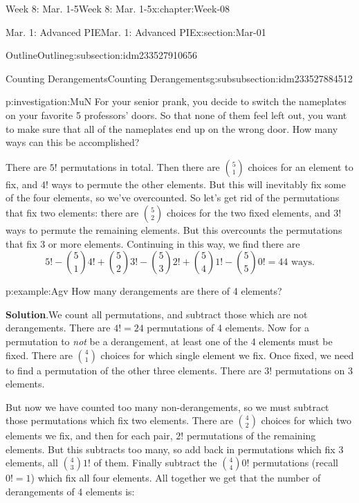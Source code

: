 \documentclass[oneside,10pt,]{book}
\newcommand{\blocktitlefont}{\relax}
\numberwithin{equation}{section}
\begin{document}
\begin{chapterptx}{Week 8: Mar. 1-5}{}{Week 8: Mar. 1-5}{}{}{x:chapter:Week-08}
\begin{sectionptx}{Mar. 1: Advanced PIE}{}{Mar. 1: Advanced PIE}{}{}{x:section:Mar-01}
\begin{subsectionptx}{Outline}{}{Outline}{}{}{g:subsection:idm233527910656}
\typeout{************************************************}
%
\begin{subsubsectionptx}{Counting Derangements}{}{Counting Derangements}{}{}{g:subsubsection:idm233527884512}
\begin{investigation}{}{p:investigation:MuN}%
For your senior prank, you decide to switch the nameplates on your favorite 5 professors' doors. So that none of them feel left out, you want to make sure that all of the nameplates end up on the wrong door. How many ways can this be accomplished?%
\par\smallskip%
\noindent\hypertarget{g:solution:idm233527883088}{}There are \(5!\) permutations in total. Then there are \(\binom{5}{1}\) choices for an element to fix, and \(4!\) ways to permute the other elements. But this will inevitably fix some of the four elements, so we've overcounted. So let's get rid of the permutations that fix two elements: there are \(\binom{5}{2}\) choices for the two fixed elements, and 3! ways to permute the remaining elements. But this overcounts the permutations that fix 3 or more elements. Continuing in this way, we find there are%
%
\begin{equation*}
5! - \binom{5}{1}4! + \binom{5}{2}3! - \binom{5}{3} 2! + \binom{5}{4} 1! - \binom{5}{5}0! = 44 \text{ ways}.
\end{equation*}
\end{investigation}%
\begin{example}{}{p:example:Agv}%
How many derangements are there of 4 elements?%
\par\smallskip%
\noindent\textbf{\blocktitlefont Solution}.\hypertarget{p:solution:GFB}{}\quad{}We count all permutations, and subtract those which are not derangements. There are \(4! = 24\) permutations of 4 elements. Now for a permutation to \emph{not} be a derangement, at least one of the 4 elements must be fixed. There are \({4 \choose 1}\) choices for which single element we fix. Once fixed, we need to find a permutation of the other three elements. There are \(3!\) permutations on 3 elements.%
\par
But now we have counted too many non-derangements, so we must subtract those permutations which fix two elements. There are \({4 \choose 2}\) choices for which two elements we fix, and then for each pair, \(2!\) permutations of the remaining elements. But this subtracts too many, so add back in permutations which fix 3 elements, all \({4 \choose 3}1!\) of them. Finally subtract the \({4 \choose 4}0!\) permutations (recall \(0! = 1\)) which fix all four elements. All together we get that the number of derangements of 4 elements is:%

\end{example}
\end{subsubsectionptx}
\end{subsectionptx}
\end{sectionptx}
\end{chapterptx}
\end{document}
